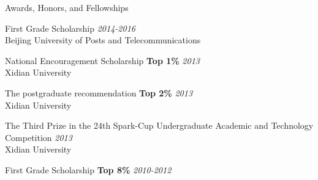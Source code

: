 \documentclass{resume} %
\begin{document}


\begin{rSection}{Awards, Honors, and Fellowships}

First Grade Scholarship \hfill {\em 2014-2016} \\ 
Beijing University of Posts and Telecommunications

National Encouragement Scholarship \textbf{Top 1\%} \hfill {\em 2013}\\
Xidian University

The postgraduate recommendation \textbf{Top 2\%} \hfill {\em 2013}\\
Xidian University

The Third Prize in the 24th Spark-Cup Undergraduate Academic and Technology Competition \hfill {\em 2013}\\
Xidian University

First Grade Scholarship \textbf{Top 8\%} \hfill {\em 2010-2012}



\end{rSection}
\end{document}
